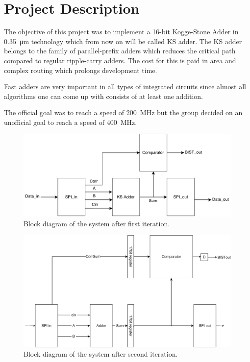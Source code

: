 \section{Project Description} \label{sec:project_description}
The objective of this project was to implement a 16-bit Kogge-Stone Adder in \SI{0.35}{\micro\m} technology which from now on will be called KS adder. The KS adder belongs to the family of parallel-prefix adders which reduces the critical path compared to regular ripple-carry adders. The cost for this is paid in area and complex routing which prolongs development time.

Fast adders are very important in all types of integrated circuits since almost all algorithms one can come up with consists of at least one addition. 

The official goal was to reach a speed of \SI{200}{\mega\Hz} but the group decided on an unofficial goal to reach a speed of \SI{400}{\mega\Hz}.

\begin{figure}[H]
  \centering
  \captionsetup{justification=centering}
  \includegraphics[scale=0.5]{../figures/TOP.pdf}
  \caption{Block diagram of the system after first iteration.} \label{fig:block_first}
\end{figure}

\begin{figure}[H]
\centering
\captionsetup{justification=centering}
\includegraphics[scale=0.1]{../figures/top_level_second.png}
\caption{Block diagram of the system after second iteration.} \label{fig:block_second}
\end{figure}

